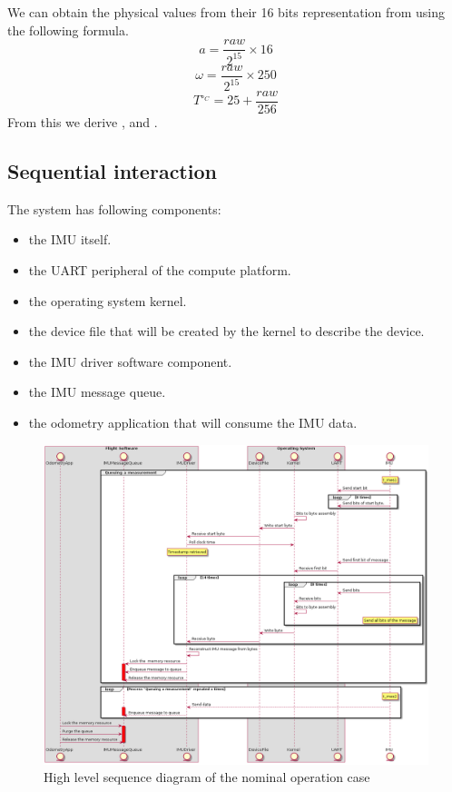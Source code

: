We can obtain the physical values from their 16 bits representation from using the following formula.
\begin{equation}
    a = \frac{raw}{2^{15}} \times 16
\end{equation}
\begin{equation}
    \omega = \frac{raw}{2^{15}} \times 250
\end{equation}
\begin{equation}
    T^{\circ_C} = 25+\frac{raw}{256}
\end{equation}
From this we derive ,  and .


\subsection{Sequential interaction}
The system has following components:
\begin{itemize}
    \item the IMU itself.
    \item the UART peripheral of the compute platform.
    \item the operating system kernel.
    \item the device file that will be created by the kernel to describe the device.
    \item the IMU driver software component.
    \item the IMU message queue.
    \item the odometry application that will consume the IMU data.
\end{itemize}

\begin{figure}[H]
    \centering
    \includegraphics[width=1.0 \textwidth]{diagrams/high_level_sys_overview.png}
    \caption{High level sequence diagram of the nominal operation case}
    \label{fig-high-level-nominal}
\end{figure}

